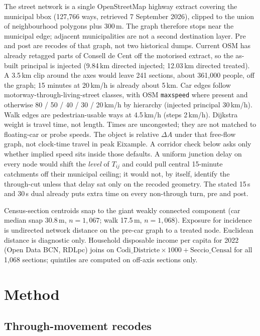 \documentclass[a4paper,fleqn]{cas-dc}
\begin{document}
The street network is a single OpenStreetMap highway extract covering the
municipal bbox (127{,}766 ways, retrieved 7 September 2026), clipped to the
union of neighbourhood polygons plus 300\,m. The graph therefore stops near
the municipal edge; adjacent municipalities are not a second destination
layer. Pre and post are recodes of
that graph, not two historical dumps. Current OSM has already retagged parts
of Consell de Cent off the motorised extract, so the as-built principal is
injected (9.84\,km directed injected; 12.03\,km directed treated).
A 3.5\,km clip around the axes would leave 241 sections, about 361{,}000
people, off the graph; 15 minutes at 20\,km/h is already about 5\,km. Car
edges follow motorway-through-living-street classes, with OSM
\texttt{maxspeed} where present and otherwise 80 / 50 / 40 / 30 / 20\,km/h
by hierarchy (injected principal 30\,km/h). Walk edges are pedestrian-usable
ways at 4.5\,km/h (steps 2\,km/h). Dijkstra weight is travel time,
not length. Times are uncongested; they are not matched to floating-car or
probe speeds. The object is relative $\Delta A$ under that free-flow graph,
not clock-time travel in peak Eixample. A corridor check below asks only
whether implied speed sits inside those defaults. A uniform junction delay
on every node would shift the \emph{level} of $T_{ij}$ and could pull
central 15-minute catchments off their municipal ceiling; it would not, by
itself, identify the through-cut unless that delay sat only on the recoded
geometry. The stated 15\,s and 30\,s dual already puts extra time on every
non-through turn, pre and post.

Census-section centroids snap to the giant weakly connected component (car
median snap 30.8\,m, $n = 1{,}067$; walk 17.5\,m, $n = 1{,}068$). Exposure
for incidence is undirected network distance on the pre-car graph to a
treated node. Euclidean distance is diagnostic only. Household disposable
income per capita for 2022 (Open Data BCN, RDLpc) joins on
$\mathrm{Codi\_Districte}\times 1000 + \mathrm{Seccio\_Censal}$ for all
1{,}068 sections; quintiles are computed on off-axis sections only.

\section{Method}
\label{sec:method}

\subsection{Through-movement recodes}
\end{document}
